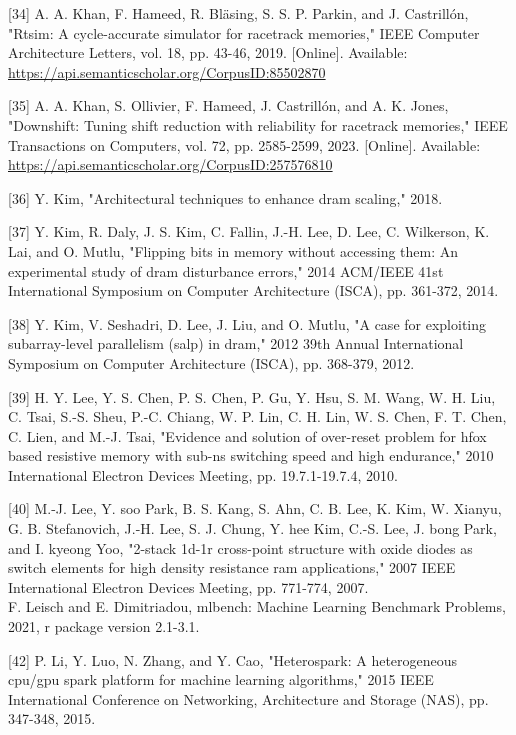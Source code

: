 \documentclass[10pt]{article}
\begin{document}
[34] A. A. Khan, F. Hameed, R. Bläsing, S. S. P. Parkin, and J. Castrillón, "Rtsim: A cycle-accurate simulator for racetrack memories," IEEE Computer Architecture Letters, vol. 18, pp. 43-46, 2019. [Online]. Available: \href{https://api.semanticscholar.org/CorpusID:85502870}{https://api.semanticscholar.org/CorpusID:85502870}

[35] A. A. Khan, S. Ollivier, F. Hameed, J. Castrillón, and A. K. Jones, "Downshift: Tuning shift reduction with reliability for racetrack memories," IEEE Transactions on Computers, vol. 72, pp. 2585-2599, 2023. [Online]. Available: \href{https://api.semanticscholar.org/CorpusID:257576810}{https://api.semanticscholar.org/CorpusID:257576810}

[36] Y. Kim, "Architectural techniques to enhance dram scaling," 2018.

[37] Y. Kim, R. Daly, J. S. Kim, C. Fallin, J.-H. Lee, D. Lee, C. Wilkerson, K. Lai, and O. Mutlu, "Flipping bits in memory without accessing them: An experimental study of dram disturbance errors," 2014 ACM/IEEE 41st International Symposium on Computer Architecture (ISCA), pp. 361-372, 2014.

[38] Y. Kim, V. Seshadri, D. Lee, J. Liu, and O. Mutlu, "A case for exploiting subarray-level parallelism (salp) in dram," 2012 39th Annual International Symposium on Computer Architecture (ISCA), pp. 368-379, 2012.

[39] H. Y. Lee, Y. S. Chen, P. S. Chen, P. Gu, Y. Hsu, S. M. Wang, W. H. Liu, C. Tsai, S.-S. Sheu, P.-C. Chiang, W. P. Lin, C. H. Lin, W. S. Chen, F. T. Chen, C. Lien, and M.-J. Tsai, "Evidence and solution of over-reset problem for hfox based resistive memory with sub-ns switching speed and high endurance," 2010 International Electron Devices Meeting, pp. 19.7.1-19.7.4, 2010.

[40] M.-J. Lee, Y. soo Park, B. S. Kang, S. Ahn, C. B. Lee, K. Kim, W. Xianyu, G. B. Stefanovich, J.-H. Lee, S. J. Chung, Y. hee Kim, C.-S. Lee, J. bong Park, and I. kyeong Yoo, "2-stack 1d-1r cross-point structure with oxide diodes as switch elements for high density resistance ram applications," 2007 IEEE International Electron Devices Meeting, pp. 771-774, 2007.\\
[41] F. Leisch and E. Dimitriadou, mlbench: Machine Learning Benchmark Problems, 2021, r package version 2.1-3.1.

[42] P. Li, Y. Luo, N. Zhang, and Y. Cao, "Heterospark: A heterogeneous cpu/gpu spark platform for machine learning algorithms," 2015 IEEE International Conference on Networking, Architecture and Storage (NAS), pp. 347-348, 2015.
\end{document}

